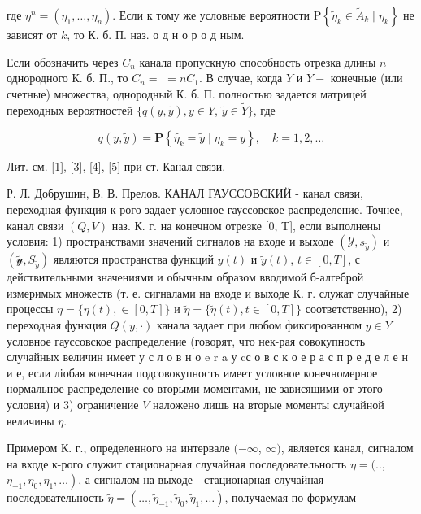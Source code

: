 \documentclass[10pt]{article}
\begin{document}
где $\eta^{n}=\left(\eta_{1}, \ldots, \eta_{n}\right)$. Если к тому же условные вероятности $\mathrm{P}\left\{\tilde{\eta}_{k} \in \tilde{A}_{k} \mid \eta_{k}\right\}$ не зависят от $k$, то К. б. П. наз. о д н о р о д ным.



Если обозначить через $C_{n}$ канала пропускную способность отрезка длины $n$ однородного К. б. П., то $C_{n}=$ $=n C_{1}$. В случае, когда $Y$ и $\tilde{Y}-$ конечные (или счетные) множества, однородный К. б. П. полностью задается матрицей переходных вероятностей $\{q(y, \tilde{y}), y \in Y$, $\tilde{y} \in \tilde{Y}\}$, где



\[

q(y, \tilde{y})=\mathbf{P}\left\{\tilde{\eta_{k}}=\tilde{y} \mid \eta_{k}=y\right\}, \quad k=1,2, \ldots

\]



Лит. см. [1], [3], [4], [5] при ст. Канал связи.



Р. Л. Добрушин, В. В. Прелов. КАНАЛ ГАУССОВСКИЙ - канал связи, переходная функция к-рого задает условное гауссовское распределение. Точнее, канал связи $(Q, V)$ наз. К. г. на конечном отрезке [0, T], если выполнены условия: 1) пространствами значений сигналов на входе и выходе $\left(\mathcal{Y}, s_{\tilde{y}}\right)$ и $\left(\tilde{\mathscr{y}}, S_{\tilde{y}}\right)$ являются пространства функций $y(t)$ и $\tilde{y}(t)$, $t \in[0, T]$, с действительными значениями и обычным образом вводимой б-алгеброй измеримых множеств (т. е. сигналами на входе и выходе К. г. служат случайные процессы $\eta=\{\eta(t), \in[0, T]\}$ и $\tilde{\eta}=\{\tilde{\eta}(t), t \in[0, T]\}$ соответственно), 2) переходная функция $Q(y, \cdot)$ канала задает при любом фиксированном $y \in Y$ условное гауссовское распределение (говорят, что нек-рая совокупность случайных величин имеет у с л о в н о e r a у cс о в с к о е р а с п р е д е л е н и е, если ліобая конечная подсовокупность имеет условное конечномерное нормальное распределение со вторыми моментами, не зависящими от этого условия) и 3) ограничение $V$ наложено лишь на вторые моменты случайной величины $\eta$.



Примером К. г., определенного на интервале $(-\infty$, $\infty)$, является канал, сигналом на входе к-рого служит стационарная случайная последовательность $\eta=(. .$, $\left.\eta_{-1}, \eta_{0}, \eta_{1}, \ldots\right)$, а сигналом на выходе - стационарная случайная последовательность $\tilde{\eta}=\left(\ldots, \tilde{\eta}_{-1}, \tilde{\eta}_{0}, \tilde{\eta}_{1}, \ldots\right)$, получаемая по формулам
\end{document}
